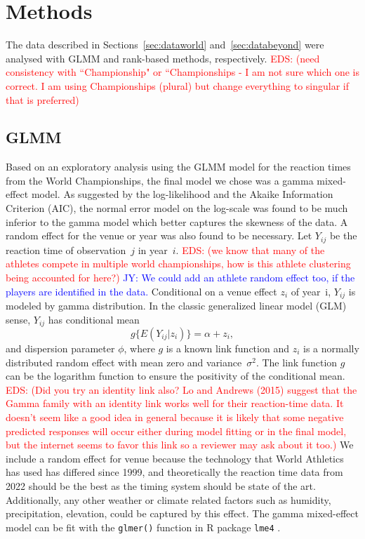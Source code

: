 \documentclass[12pt, letterpaper, titlepage]{article}
\newcommand{\jy}[1]{\textcolor{blue}{JY: #1}}
\newcommand{\eds}[1]{\textcolor{red}{EDS: (#1)}}
\begin{document}
\section{Methods} \label{sec:Methods}

The %
data described in Sections~\ref{sec:dataworld} and~\ref{sec:databeyond} were
analysed with GLMM and rank-based methods, respectively.
\eds{need consistency with ``Championship" or ``Championships - I am not sure 
which one is correct.  I am using Championships (plural) but
change everything to singular if that is preferred}

\subsection{GLMM}\label{sec:glmm}
Based on an exploratory analysis using the GLMM model for the reaction times
from the World Championships, the final model we chose was a gamma mixed-effect 
model. As suggested by the log-likelihood and the Akaike Information
Criterion (AIC), the normal error model on the log-scale was found to be
much inferior to the gamma model which better captures the skewness of the
data. A random effect for the venue or year was also found to be necessary.
Let $Y_{ij}$ be the reaction time of observation~$j$ in year~$i$.
\eds{we know that many of the athletes compete in multiple world championships,
  how is this athlete clustering being accounted for here?}
\jy{We could add an athlete random effect too, if the players are identified in the data.}
Conditional on a venue effect $z_i$ of year~i,  $Y_{ij}$ is modeled by 
gamma distribution. In the classic generalized linear model (GLM) sense,
$Y_{ij}$ has conditional mean
\[
g\{E(Y_{ij} | z_i)\} = \alpha + z_i,
\]
and dispersion parameter $\phi$, where $g$ is a known link function and
$z_i$ is a normally distributed random effect with mean zero and
variance~$\sigma^2$. The link function $g$ can be the logarithm function to
ensure the positivity of the conditional mean.
\eds{Did you try an identity link also? Lo and Andrews (2015) suggest that the 
Gamma family with an identity link works well for their reaction-time data.
It doesn't seem like a good idea in general because it is likely that some 
negative predicted responses will occur either during model fitting or in the 
final model, but the internet seems to favor this link so a reviewer may ask 
about it too.}
We include a random effect for venue because the technology
that World Athletics has used has differed since 1999, and theoretically the
reaction time data from 2022 should be the best as the timing system should be
state of the art. Additionally, any other weather or climate related factors 
such as humidity, precipitation, elevation, could be captured by this effect.
The gamma mixed-effect model can be fit with the \texttt{glmer()} function in R
package \texttt{lme4} \citep{lme4}.
\end{document}
